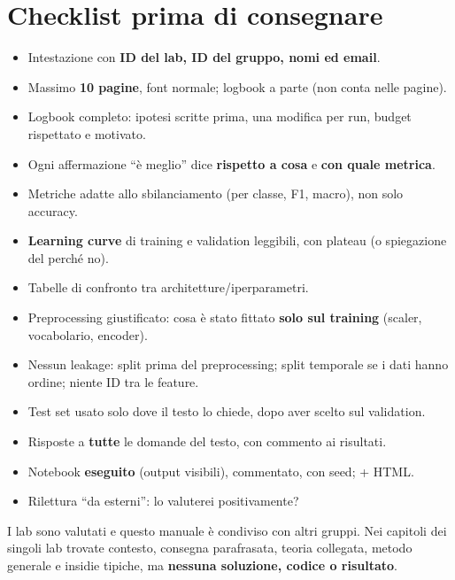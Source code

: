 \section{Checklist prima di consegnare}
\begin{itemize}
  \item[$\square$] Intestazione con \textbf{ID del lab, ID del gruppo, nomi ed email}.
  \item[$\square$] Massimo \textbf{10 pagine}, font normale; logbook a parte (non conta nelle pagine).
  \item[$\square$] Logbook completo: ipotesi scritte prima, una modifica per run, budget rispettato e motivato.
  \item[$\square$] Ogni affermazione ``è meglio'' dice \textbf{rispetto a cosa} e \textbf{con quale metrica}.
  \item[$\square$] Metriche adatte allo sbilanciamento (per classe, F1, macro), non solo accuracy.
  \item[$\square$] \textbf{Learning curve} di training e validation leggibili, con plateau (o spiegazione del perché no).
  \item[$\square$] Tabelle di confronto tra architetture/iperparametri.
  \item[$\square$] Preprocessing giustificato: cosa è stato fittato \textbf{solo sul training} (scaler, vocabolario, encoder).
  \item[$\square$] Nessun leakage: split prima del preprocessing; split temporale se i dati hanno ordine; niente ID tra le feature.
  \item[$\square$] Test set usato solo dove il testo lo chiede, dopo aver scelto sul validation.
  \item[$\square$] Risposte a \textbf{tutte} le domande del testo, con commento ai risultati.
  \item[$\square$] Notebook \textbf{eseguito} (output visibili), commentato, con seed;  + HTML.
  \item[$\square$] Rilettura ``da esterni'': lo valuterei positivamente?
\end{itemize}

\begin{nota}
I lab sono valutati e questo manuale è condiviso con altri gruppi. Nei capitoli dei singoli lab
trovate contesto, consegna parafrasata, teoria collegata, metodo generale e insidie tipiche, ma
\textbf{nessuna soluzione, codice o risultato}.
\end{nota}
